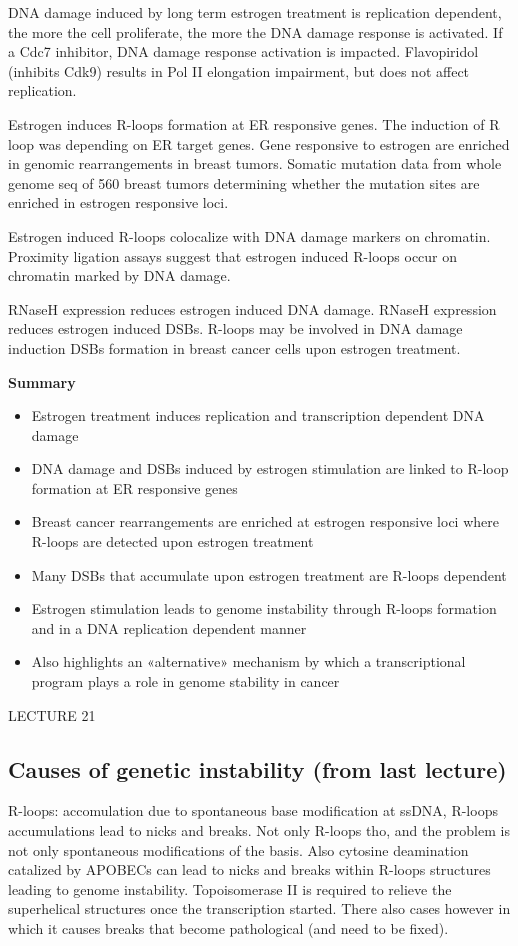 DNA damage induced by long term estrogen treatment is replication dependent, the more the cell proliferate, the more the DNA damage response is activated. If a Cdc7 inhibitor, DNA damage response activation is impacted. Flavopiridol (inhibits Cdk9) results in Pol II elongation impairment, but does not affect replication.

Estrogen induces R-loops formation at ER responsive genes. The induction of R loop was depending on ER target genes. Gene responsive to estrogen are enriched in genomic rearrangements in breast tumors. Somatic mutation data from whole genome seq of 560 breast tumors determining whether the mutation sites are enriched in estrogen responsive loci.

Estrogen induced R-loops colocalize with DNA damage markers on chromatin. Proximity ligation assays suggest that estrogen induced R-loops occur on chromatin marked by DNA damage.

RNaseH expression reduces estrogen induced DNA damage. RNaseH expression reduces estrogen induced DSBs. R-loops may be involved in DNA damage induction DSBs formation in breast cancer cells upon estrogen treatment.

\textbf{Summary}
\begin{itemize}
\tightlist
\item
  Estrogen treatment induces replication and transcription dependent DNA damage
\item
  DNA damage and DSBs induced by estrogen stimulation are linked to R-loop formation at ER responsive genes
\item
  Breast cancer rearrangements are enriched at estrogen responsive loci where R-loops are detected upon estrogen treatment
\item
  Many DSBs that accumulate upon estrogen treatment are R-loops dependent
\item
  Estrogen stimulation leads to genome instability through R-loops formation and in a DNA
  replication dependent manner
\item
  Also highlights an «alternative» mechanism by which a transcriptional program plays a role in genome stability in cancer
\end{itemize}

LECTURE 21

\subsection{Causes of genetic instability (from last lecture)}
R-loops: accomulation due to spontaneous base modification at ssDNA,
R-loops accumulations lead to nicks and breaks. Not only R-loops tho,
and the problem is not only spontaneous modifications of the basis. Also
cytosine deamination catalized by APOBECs can lead to nicks and breaks
within R-loops structures leading to genome instability. Topoisomerase
II is required to relieve the superhelical structures once the
transcription started. There also cases however in which it causes
breaks that become pathological (and need to be fixed).\\

